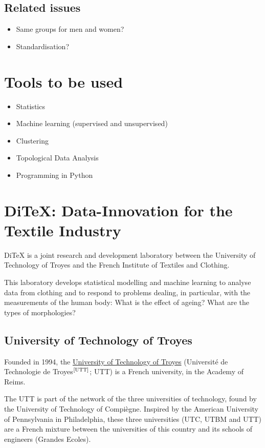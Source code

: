 \documentclass[12pt,a4paper,openany,UKenglish]{scrreprt}
\newcommand{\bib}[1]{$^\text{\cite{#1}}$}
\begin{document}
\subsection*{Related issues}
\begin{itemize}
	\setlength\itemsep{-0.25em}
	\item Same groups for men and women?
	\item Standardisation?
\end{itemize}

\section{Tools to be used}
\begin{itemize}
	\setlength\itemsep{-0.25em}
	\item Statistics
	\item Machine learning (supervised and unsupervised)
	\item Clustering
	\item Topological Data Analysis
	\item Programming in Python
\end{itemize}

\section{DiTeX: Data-Innovation for the Textile Industry}
DiTeX is a joint research and development laboratory between the University of Technology of Troyes and the French Institute of Textiles and Clothing.

This laboratory develops statistical modelling and machine learning to analyse data from clothing and to respond to problems dealing, in particular, with the measurements of the human body: What is the effect of ageing? What are the types of morphologies?

\subsection{University of Technology of Troyes}
Founded in 1994, the \href{https://www.utt.fr/}{University of Technology of Troyes} (Université de Technologie de Troyes\bib{UTT}; UTT) is a French university, in the Academy of Reims.

The UTT is part of the network of the three universities of technology, found by the University of Technology of Compiègne.
Inspired by the American University of Pennsylvania in Philadelphia, these three universities (UTC, UTBM and UTT) are a French mixture between the universities of this country and its schools of engineers (Grandes Ecoles).
\end{document}
